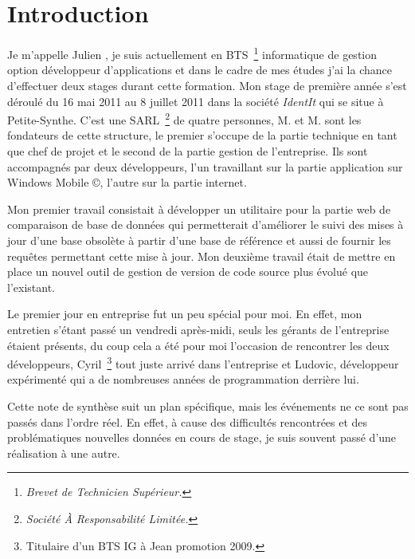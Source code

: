 \chapter{Introduction}

Je m'appelle Julien , je suis actuellement en BTS\,
\footnote{\emph{Brevet de Technicien Supérieur.}} informatique de gestion
option développeur d'applications et dans le cadre de mes études j'ai la chance
d'effectuer deux stages durant cette formation. Mon stage de première année
s'est déroulé du 16 mai 2011 au 8 juillet 2011 dans la société \emph{IdentIt}
qui se situe à Petite-Synthe. C'est une SARL\, \footnote{\emph{Société À
Responsabilité Limitée.}} de quatre personnes, M. et
M. sont les fondateurs de cette structure, le premier s'occupe de
la partie technique en tant que chef de projet et le second de la partie
gestion de l'entreprise. Ils sont accompagnés par deux développeurs, l'un
travaillant sur la partie application sur Windows Mobile \copyright, l'autre
sur la partie internet.

Mon premier travail consistait à développer un utilitaire pour la partie web de
comparaison de base de données qui permetterait d'améliorer le suivi des mises
à jour d'une base obsolète à partir d'une base de référence et aussi de fournir
les requêtes permettant cette mise à jour. Mon deuxième travail était de mettre
en place un nouvel outil de gestion de version de code source plus évolué que
l'existant.

Le premier jour en entreprise fut un peu spécial pour moi. En effet, mon
entretien s'étant passé un vendredi après-midi, seuls les gérants de
l'entreprise étaient présents, du coup cela a été pour moi l'occasion de
rencontrer les deux développeurs, Cyril\, \footnote{Titulaire d'un BTS IG à
Jean  promotion 2009.} tout juste arrivé dans l'entreprise et
Ludovic, développeur expérimenté qui a de nombreuses années de programmation
derrière lui.

Cette note de synthèse suit un plan spécifique, mais les événements ne ce sont
pas passés dans l'ordre réel. En effet, à cause des difficultés rencontrées et
des problématiques nouvelles données en cours de stage, je suis souvent passé
d'une réalisation à une autre.
